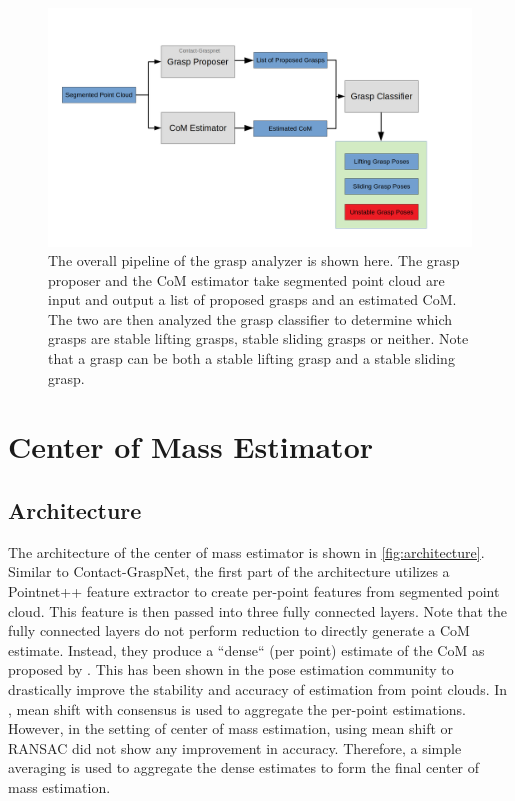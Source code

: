 \documentclass[12pt]{ucsddissertation}
\begin{document}
\begin{figure}
	\centering
	\includegraphics[width=\linewidth]{figures/overallPipeline.png}
	\caption[Overall Pipeline of the proposed grasp analyzer]{The overall pipeline of the grasp analyzer is shown here. The grasp proposer and the CoM estimator take segmented point cloud are input and output a list of proposed grasps and an estimated CoM. The two are then analyzed the grasp classifier to determine which grasps are stable lifting grasps, stable sliding grasps or neither. Note that a grasp can be both a stable lifting grasp and a stable sliding grasp.}
	\label{fig:overallPipeline}
\end{figure}

\section{Center of Mass Estimator}
\subsection{Architecture}
The architecture of the center of mass estimator is shown in \ref{fig:architecture}. Similar to Contact-GraspNet, the first part of the architecture utilizes a Pointnet++ feature extractor to create per-point features from segmented point cloud. This feature is then passed into three fully connected layers. Note that the fully connected layers do not perform reduction to directly generate a CoM estimate. Instead, they produce a ``dense`` (per point) estimate of the CoM as proposed by \cite{wan2017dense}. This has been shown in the pose estimation community to drastically improve the stability and accuracy of estimation from point clouds. In \cite{wan2017dense}, mean shift with consensus is used to aggregate the per-point estimations. However, in the setting of center of mass estimation, using mean shift or RANSAC did not show any improvement in accuracy. Therefore, a simple averaging is used to aggregate the dense estimates to form the final center of mass estimation.
\end{document}
